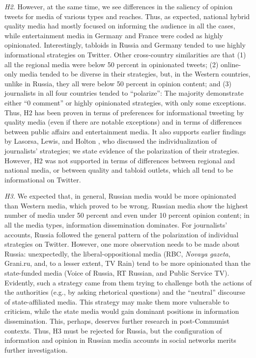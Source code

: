 \textit{H2.} However, at the same time, we see differences in the saliency of opinion tweets for media of various types and reaches. Thus, as expected, national hybrid quality media had mostly focused on informing the audience in all the cases, while entertainment media in Germany and France were coded as highly opinionated. Interestingly, tabloids in Russia and Germany tended to use highly informational strategies on Twitter. Other cross-country similarities are that (1) all the regional media were below 50 percent in opinionated tweets; (2) online-only media tended to be diverse in their strategies, but, in the Western countries, unlike in Russia, they all were below 50 percent in opinion content; and (3) journalists in all four countries tended to “polarize”: The majority demonstrate either “0 comment” or highly opinionated strategies, with only some exceptions. Thus, H2 has been proven in terms of preferences for informational tweeting by quality media (even if there are notable exceptions) and in terms of differences between public affairs and entertainment media. It also supports earlier findings by Lasorsa, Lewis, and Holton \cite{LasorsaLewisHolton}, who discussed the individualization of journalists’ strategies; we state evidence of the polarization of their strategies. However, H2 was not supported in terms of differences between regional and national media, or between quality and tabloid outlets, which all tend to be informational on Twitter.

\textit{H3.} We expected that, in general, Russian media would be more opinionated than Western media, which proved to be wrong. Russian media show the highest number of media under 50 percent and even under 10 percent opinion content; in all the media types, information dissemination dominates. For journalists’ accounts, Russia followed the general pattern of the polarization of individual strategies on Twitter. However, one more observation needs to be made about Russia: unexpectedly, the liberal-oppositional media (RBC, \textit{Novaya gazeta}, Grani.ru, and, to a lesser extent, TV Rain) tend to be more opinionated than the state-funded media (Voice of Russia, RT Russian, and Public Service TV). Evidently, such a strategy came from them trying to challenge both the actions of the authorities (e.g., by asking rhetorical questions) and the “neutral” discourse of state-affiliated media. This strategy may make them more vulnerable to criticism, while the state media would gain dominant positions in information dissemination. This, perhaps, deserves further research in post-Communist contexts. Thus, H3 must be rejected for Russia, but the configuration of information and opinion in Russian media accounts in social networks merits further investigation.

